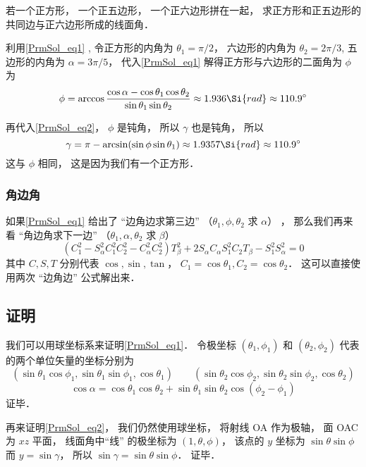 \begin{example}{}
若一个正方形， 一个正五边形， 一个正六边形拼在一起， 求正方形和正五边形的共同边与正六边形所成的线面角．

利用\autoref{PrmSol_eq1} , 令正方形的内角为 $\theta_1 = \pi/2$， 六边形的内角为 $\theta_2 = 2\pi/3$, 五边形的内角为 $\alpha = 3\pi/5$， 代入\autoref{PrmSol_eq1} 解得正方形与六边形的二面角为 $\phi$ 为
\begin{equation}
\phi = \arccos\frac{\cos\alpha - \cos\theta_1 \cos\theta_2}{\sin\theta_1\sin\theta_2} \approx 1.936\Si{rad} \approx 110.9^\circ
\end{equation}

再代入\autoref{PrmSol_eq2}， $\phi$ 是钝角， 所以 $\gamma$ 也是钝角， 所以
\begin{equation}
\gamma = \pi - \arcsin(\sin\phi \sin\theta_1) \approx 1.9357 \Si{rad} \approx 110.9^\circ
\end{equation}
这与 $\phi$ 相同， 这是因为我们有一个正方形．
\end{example}

\subsubsection{角边角}
如果\autoref{PrmSol_eq1} 给出了 “边角边求第三边” （$\theta_1, \phi, \theta_2$ 求 $\alpha$） ， 那么我们再来看 “角边角求下一边” （$\theta_1, \alpha, \theta_2$ 求 $\beta$）
\begin{equation}
(C_1^2 - S_\alpha^2 C_1^2 C_2^2 - C_\alpha^2 C_2^2)T_\beta^2 + 2S_\alpha C_\alpha S_1^2 C_2 T_\beta - S_1^2 S_\alpha^2 = 0
\end{equation}
其中 $C,S,T$ 分别代表 $\cos, \sin, \tan$， $C_1 = \cos\theta_1, C_2 = \cos\theta_2$． 这可以直接使用两次 “边角边” 公式解出来．


\subsection{证明}
我们可以用球坐标系来证明\autoref{PrmSol_eq1}． 令极坐标 $(\theta_1, \phi_1)$ 和 $(\theta_2, \phi_2)$ 代表的两个单位矢量的坐标分别为
\begin{equation}
(\sin\theta_1\cos\phi_1, \sin\theta_1\sin\phi_1, \cos\theta_1)
\qquad
(\sin\theta_2\cos\phi_2, \sin\theta_2\sin\phi_2, \cos\theta_2)
\end{equation}
\begin{equation}
\cos\alpha = \cos\theta_1 \cos\theta_2 + \sin\theta_1 \sin\theta_2 \cos(\phi_2 - \phi_1)
\end{equation}
证毕．

再来证明\autoref{PrmSol_eq2}， 我们仍然使用球坐标， 将射线 OA 作为极轴， 面 OAC 为 $xz$ 平面， 线面角中“线” 的极坐标为 $(1, \theta, \phi)$， 该点的 $y$ 坐标为 $\sin\theta \sin\phi$ 而 $y = \sin\gamma$， 所以 $\sin\gamma = \sin\theta \sin\phi$． 证毕．